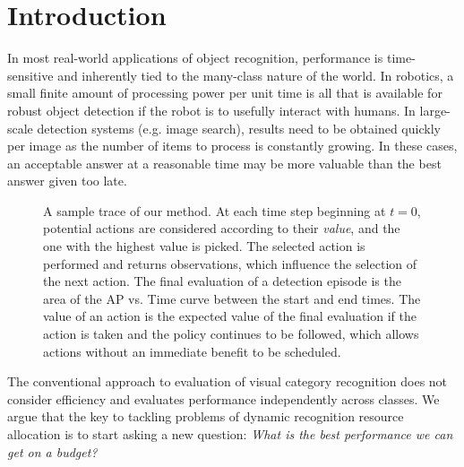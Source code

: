 \section{Introduction}

In most real-world applications of object recognition, performance is time-sensitive and inherently tied to the many-class nature of the world.
In robotics, a small finite amount of processing power per unit time is all that is available for robust object detection if the robot is to usefully interact with humans.
In large-scale detection systems (e.g. image search), results need to be obtained quickly per image as the number of items to process is constantly growing.
In these cases, an acceptable answer at a reasonable time may be more valuable than the best answer given too late.

\begin{figure}[ht!]
  \caption{
A sample trace of our method.
At each time step beginning at $t=0$, potential actions are considered according to their \emph{value}, and the one with the highest value is picked.
The selected action is performed and returns observations, which influence the selection of the next action.
The final evaluation of a detection episode is the area of the AP vs. Time curve between the start and end times.
The value of an action is the expected value of the final evaluation if the action is taken and the policy continues to be followed, which allows actions without an immediate benefit to be scheduled.
}
  \label{fig:figure1}
\end{figure}

The conventional approach to evaluation of visual category recognition does not consider efficiency and evaluates performance independently across classes.
We argue that the key to tackling problems of dynamic recognition resource allocation is to start asking a new question:
\emph{What is the best performance we can get on a budget?}

